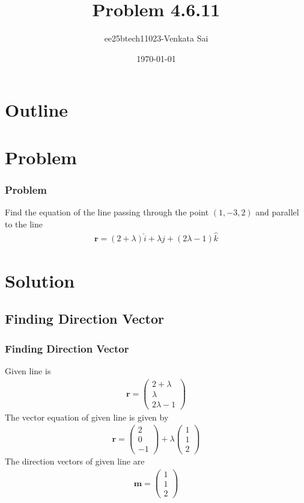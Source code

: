 \documentclass{beamer}
\title{Problem 4.6.11}
\author{ee25btech11023-Venkata Sai}
\date{\today}
\providecommand{\brak}[1]{\ensuremath{\left(#1\right)}}
\theoremstyle{remark}
\newcommand{\myvec}[1]{\ensuremath{\begin{pmatrix}#1\end{pmatrix}}}
\let\vec\mathbf
\numberwithin{equation}{section}
\begin{document}
\begin{frame}
\titlepage
\end{frame}

\section*{Outline}
\begin{frame}
\tableofcontents
\end{frame}

\section{Problem}

\begin{frame}
\frametitle{Problem}
\setcounter{section}{1}
Find the equation of the line passing through the point $(1, -3, 2)$ and parallel to the line
\begin{align}
\vec{r} = \brak{2 + \lambda}\hat{i} + \lambda\hat{j} + \brak{2\lambda - 1}\hat{k} 
\end{align}
\end{frame}
\section{Solution}

\subsection{Finding Direction Vector}
\begin{frame}
\frametitle{Finding Direction Vector}
Given line is
\begin{align}
 \vec{r} = \myvec{2+\lambda\\\lambda\\2\lambda-1}
\end{align}
The vector equation of given line is given by
\begin{align}
\vec{r}=\myvec{2\\0\\-1}+\lambda\myvec{1\\1\\2}
\end{align}
The direction vectors of given line are
\begin{align}
    \vec{m}=\myvec{1\\1\\2}
\end{align}
\end{frame}
\end{document}
